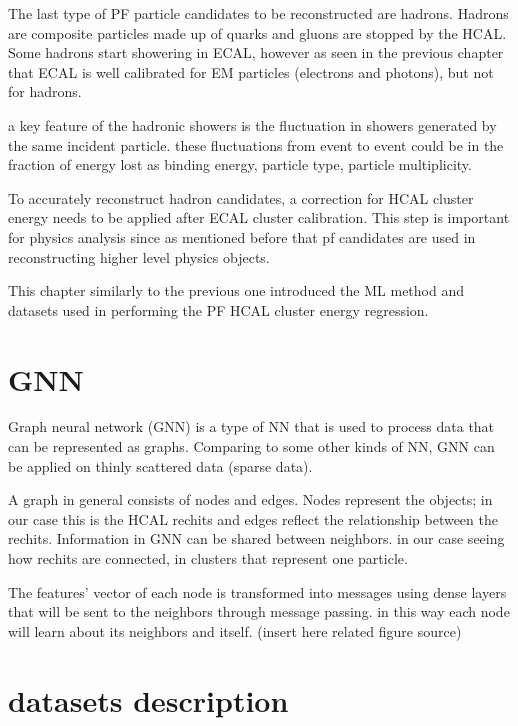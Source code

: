 
The last type of PF particle candidates to be reconstructed are hadrons. Hadrons are composite particles made up of quarks and gluons are stopped by the HCAL. Some hadrons start showering in ECAL, however as seen in the previous chapter that ECAL is well calibrated for EM particles (electrons and photons), but not for hadrons.

a key feature of the hadronic showers is the fluctuation in showers generated by the same incident particle. these fluctuations from event to event could be in the fraction of energy lost as binding energy, particle type, particle multiplicity.

To accurately reconstruct hadron candidates, a correction for HCAL cluster energy needs to be applied after ECAL cluster calibration. This step is important for physics analysis since as mentioned before that pf candidates are used in reconstructing higher level physics objects.

This chapter similarly to the previous one introduced the ML method and datasets used in performing the PF HCAL cluster energy regression.  

\section{GNN} %

Graph neural network (GNN) is a type of NN that is used to process data that can be represented as graphs. Comparing to some other kinds of NN, GNN can be applied on thinly scattered data (sparse data).

A graph in general consists of nodes and edges. Nodes represent the objects; in our case this is the HCAL rechits and edges reflect the relationship between the rechits. Information in GNN can be shared between neighbors. in our case seeing how rechits are connected, in clusters that represent one particle.

The features’ vector of each node is transformed into messages using dense layers that will be sent to the neighbors through message passing.  in this way each node will learn about its neighbors and itself. (insert here related figure source) 


\section{datasets description}

